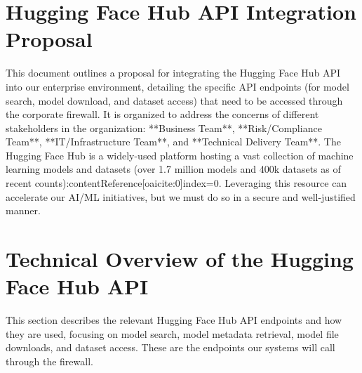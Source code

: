\documentclass{article}
\begin{document}
\section*{Hugging Face Hub API Integration Proposal}

This document outlines a proposal for integrating the Hugging Face Hub API into our enterprise environment, detailing the specific API endpoints (for model search, model download, and dataset access) that need to be accessed through the corporate firewall. It is organized to address the concerns of different stakeholders in the organization: **Business Team**, **Risk/Compliance Team**, **IT/Infrastructure Team**, and **Technical Delivery Team**. The Hugging Face Hub is a widely-used platform hosting a vast collection of machine learning models and datasets (over 1.7 million models and 400k datasets as of recent counts):contentReference[oaicite:0]{index=0}. Leveraging this resource can accelerate our AI/ML initiatives, but we must do so in a secure and well-justified manner.

\section{Technical Overview of the Hugging Face Hub API}
This section describes the relevant Hugging Face Hub API endpoints and how they are used, focusing on model search, model metadata retrieval, model file downloads, and dataset access. These are the endpoints our systems will call through the firewall.
\end{document}

